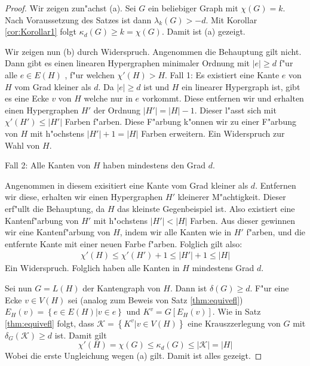 \begin{proof}
    Wir zeigen zun"achst (a). Sei $G$ ein beliebiger Graph mit $\chi(G) = k$. Nach Voraussetzung des Satzes ist dann $\lambda_{k}\left( G \right) > -d$. Mit Korollar \ref{cor:Korollar1} folgt $\kappa_{d}\left( G \right) \geq k = \chi\left( G \right)$. 
    Damit ist (a) gezeigt. 

    Wir zeigen nun (b) durch Widerspruch. Angenommen die Behauptung gilt nicht. Dann gibt es einen linearen Hypergraphen minimaler Ordnung mit $|e| \geq d$ f"ur alle $e\in E(H)$ , f"ur welchen $\chi'(H) > H$. 
    Fall 1: Es existiert eine Kante $e$ von $H$ vom Grad kleiner als $d$. Da $|e| \geq d$ ist und $H$ ein linearer Hypergraph ist, gibt es eine Ecke $v$ von $H$ welche nur in $e$ vorkommt. Diese entfernen wir und erhalten einen Hypergraphen $H'$ der Ordnung $|H'| = |H|-1$. Dieser l"asst sich mit $\chi'(H') \leq |H'|$ Farben f"arben. Diese F"arbung k"onnen wir zu einer F"arbung von $H$ mit h"ochstens $|H'|+1 = |H|$ Farben erweitern. Ein Widerspruch zur Wahl von $H$.

    Fall 2: Alle Kanten von $H$ haben mindestens den Grad $d$. 
   
    Angenommen in diesem exisitiert eine Kante vom Grad kleiner als $d$. Entfernen wir diese, erhalten wir einen Hypergraphen $H'$ kleinerer M"achtigkeit.
      Dieser erf"ullt die Behauptung, da $H$ das kleinste Gegenbeispiel ist. Also existiert eine Kantenf"arbung von $H'$ mit h"ochstens $|H'| < |H|$ Farben. Aus dieser gewinnen wir eine Kantenf"arbung von $H$, indem wir alle Kanten wie in $H'$ f"arben, und die entfernte Kante mit einer neuen Farbe f"arben. Folglich gilt also:
      \begin{align*}
        \chi'(H) \leq \chi'(H') +1 \leq |H'|+1 \leq |H|
      \end{align*}
      Ein Widerspruch. Folglich haben alle Kanten in $H$ mindestens Grad $d$. 

      Sei nun $G=L(H)$ der Kantengraph von $H$. Dann ist $\delta(G) \geq d$. F"ur eine Ecke  $v\in V(H)$ sei (analog zum Beweis von  Satz \ref{thm:equivefl}) $E_{H}(v) = \left\{ e\in E(H) | v\in e \right\}$ und $K^{v} = G[E_{H}(v)]$. Wie in Satz \ref{thm:equivefl} folgt, dass $\mathcal{K}=\left\{ K^{v} | v \in V(H) \right\}$ eine Krauszzerlegung von $G$ mit $\delta_{G}(\mathcal{K}) \geq d$ ist. Damit gilt
      \begin{equation*}
        \chi'(H) = \chi(G) \leq \kappa_{d}(G) \leq |\mathcal{K}| = |H|
      \end{equation*}
      Wobei die erste Ungleichung wegen (a) gilt. Damit ist alles gezeigt. 
\end{proof}


